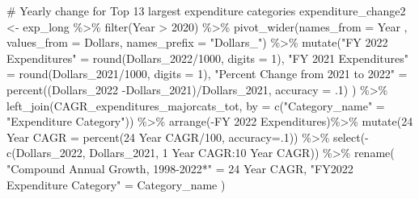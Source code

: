 \documentclass[
  letterpaper,
  DIV=11,
  numbers=noendperiod]{scrreport}
\newenvironment{Shaded}{\begin{snugshade}}{\end{snugshade}}
\newcommand{\AttributeTok}[1]{\textcolor[rgb]{0.40,0.45,0.13}{#1}}
\newcommand{\CommentTok}[1]{\textcolor[rgb]{0.37,0.37,0.37}{#1}}
\newcommand{\DecValTok}[1]{\textcolor[rgb]{0.68,0.00,0.00}{#1}}
\newcommand{\FunctionTok}[1]{\textcolor[rgb]{0.28,0.35,0.67}{#1}}
\newcommand{\NormalTok}[1]{\textcolor[rgb]{0.00,0.23,0.31}{#1}}
\newcommand{\OtherTok}[1]{\textcolor[rgb]{0.00,0.23,0.31}{#1}}
\newcommand{\SpecialCharTok}[1]{\textcolor[rgb]{0.37,0.37,0.37}{#1}}
\newcommand{\StringTok}[1]{\textcolor[rgb]{0.13,0.47,0.30}{#1}}
\begin{document}
\begin{Shaded}
\begin{Highlighting}[]
\CommentTok{\# Yearly change for Top 13 largest expenditure categories}
\NormalTok{expenditure\_change2 }\OtherTok{\textless{}{-}}\NormalTok{ exp\_long }\SpecialCharTok{\%\textgreater{}\%}
  \FunctionTok{filter}\NormalTok{(Year }\SpecialCharTok{\textgreater{}} \DecValTok{2020}\NormalTok{) }\SpecialCharTok{\%\textgreater{}\%}
  \FunctionTok{pivot\_wider}\NormalTok{(}\AttributeTok{names\_from =}\NormalTok{ Year , }\AttributeTok{values\_from =}\NormalTok{ Dollars,   }\AttributeTok{names\_prefix =} \StringTok{"Dollars\_"}\NormalTok{) }\SpecialCharTok{\%\textgreater{}\%}
  \FunctionTok{mutate}\NormalTok{(}\StringTok{"FY 2022 Expenditures"} \OtherTok{=} \FunctionTok{round}\NormalTok{(Dollars\_2022}\SpecialCharTok{/}\DecValTok{1000}\NormalTok{, }\AttributeTok{digits =} \DecValTok{1}\NormalTok{),}
         \StringTok{"FY 2021 Expenditures"} \OtherTok{=} \FunctionTok{round}\NormalTok{(Dollars\_2021}\SpecialCharTok{/}\DecValTok{1000}\NormalTok{, }\AttributeTok{digits =} \DecValTok{1}\NormalTok{),}
         \StringTok{"Percent Change from 2021 to 2022"} \OtherTok{=} \FunctionTok{percent}\NormalTok{((Dollars\_2022 }\SpecialCharTok{{-}}\NormalTok{Dollars\_2021)}\SpecialCharTok{/}\NormalTok{Dollars\_2021, }\AttributeTok{accuracy =}\NormalTok{ .}\DecValTok{1}\NormalTok{) )  }\SpecialCharTok{\%\textgreater{}\%}
  \FunctionTok{left\_join}\NormalTok{(CAGR\_expenditures\_majorcats\_tot, }\AttributeTok{by =} \FunctionTok{c}\NormalTok{(}\StringTok{"Category\_name"} \OtherTok{=} \StringTok{"Expenditure Category"}\NormalTok{)) }\SpecialCharTok{\%\textgreater{}\%} 
  \FunctionTok{arrange}\NormalTok{(}\SpecialCharTok{{-}}\StringTok{\textasciigrave{}}\AttributeTok{FY 2022 Expenditures}\StringTok{\textasciigrave{}}\NormalTok{)}\SpecialCharTok{\%\textgreater{}\%}
  \FunctionTok{mutate}\NormalTok{(}\StringTok{\textasciigrave{}}\AttributeTok{24 Year CAGR}\StringTok{\textasciigrave{}} \OtherTok{=} \FunctionTok{percent}\NormalTok{(}\StringTok{\textasciigrave{}}\AttributeTok{24 Year CAGR}\StringTok{\textasciigrave{}}\SpecialCharTok{/}\DecValTok{100}\NormalTok{, }\AttributeTok{accuracy=}\NormalTok{.}\DecValTok{1}\NormalTok{)) }\SpecialCharTok{\%\textgreater{}\%}
  \FunctionTok{select}\NormalTok{(}\SpecialCharTok{{-}}\FunctionTok{c}\NormalTok{(Dollars\_2022, Dollars\_2021, }\StringTok{\textasciigrave{}}\AttributeTok{1 Year CAGR}\StringTok{\textasciigrave{}}\SpecialCharTok{:}\StringTok{\textasciigrave{}}\AttributeTok{10 Year CAGR}\StringTok{\textasciigrave{}}\NormalTok{)) }\SpecialCharTok{\%\textgreater{}\%}
  \FunctionTok{rename}\NormalTok{( }\StringTok{"Compound Annual Growth, 1998{-}2022*"} \OtherTok{=} \StringTok{\textasciigrave{}}\AttributeTok{24 Year CAGR}\StringTok{\textasciigrave{}}\NormalTok{, }
          \StringTok{"FY2022 Expenditure Category"} \OtherTok{=}\NormalTok{ Category\_name )}


\end{Highlighting}
\end{Shaded}
\end{document}
